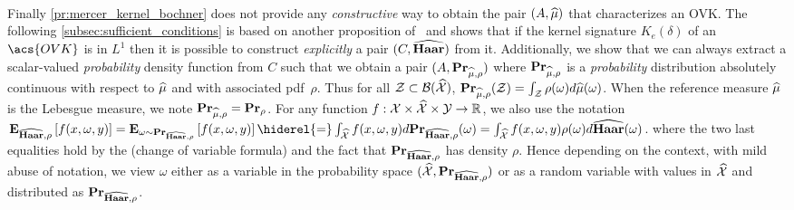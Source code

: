 \documentclass[twoside,11pt]{article}
\begin{document}
\paragraph{}
Finally \cref{pr:mercer_kernel_bochner} does not provide any
\emph{constructive} way to obtain the pair $(A,\widehat{\mu})$ that characterizes
an \acs{OVK}. The following \cref{subsec:sufficient_conditions} is based on
another proposition of~\citeauthor{carmeli2006vector} and shows that if the
kernel signature $K_e(\delta)$ of an $\acs{OVK}$ is in $L^1$ then it is
possible to construct \emph{explicitly} a pair $(C,\widehat{\mathbf{Haar}})$ from it.
Additionally, we show that we can always extract a scalar-valued
\emph{probability} density function from $C$ such that we obtain a pair
$(A,{\mathbf{{Pr}}}_{\widehat{\mu},\rho})$ where ${\mathbf{{Pr}}}_{\widehat{\mu},\rho}$ is
a \emph{probability} distribution absolutely continuous with respect to
$\widehat{\mu}$ and with associated \ac{pdf}~$\rho$. Thus for all
$\mathcal{Z}\subset\mathcal{B}(\widehat{\mathcal{X}})$,
${\mathbf{{Pr}}}_{\widehat{\mu},\rho}(\mathcal{Z})=\int_{\mathcal{Z}}
\rho(\omega)d\widehat{\mu}(\omega)$.  When the reference measure $\widehat{\mu}$ is
the Lebesgue measure, we note
${\mathbf{{Pr}}}_{\widehat{\mu},\rho}={\mathbf{{Pr}}}_\rho$. For any function
$f:\mathcal{X}\times\widehat{\mathcal{X}}\times\mathcal{Y}\to\mathbb{R}$, we also
use the notation $\expectation_{\dual{\Haar}, \rho}\left[f(x, \omega, y)\right]
=\expectation_{\omega\sim\probability_{\dual{\Haar},\rho}}\left[f(x, \omega,
y)\right] \hiderel{=}\int_{\dual{\mathcal{X}}} f(x, \omega, y)
d\probability_{\dual{\Haar}, \rho}(\omega) =\int_{\dual{\mathcal{X}}} f(x,
\omega, y)\rho(\omega) d\dual{\Haar}(\omega)$.  where the two last equalities
hold by the  (change of variable
formula) and the fact that ${\mathbf{{Pr}}}_{\widehat{\mathbf{Haar}}, \rho}$ has density
$\rho$. Hence depending on the context, with mild abuse of notation, we view
$\omega$ either as a variable in the probability space $(\widehat{\mathcal{X}},
{\mathbf{{Pr}}}_{\widehat{\mathbf{Haar}}, \rho})$ or as a random variable  with values in
$\widehat{\mathcal{X}}$ and distributed as ${\mathbf{{Pr}}}_{\widehat{\mathbf{Haar}}, \rho}$.
\end{document}
